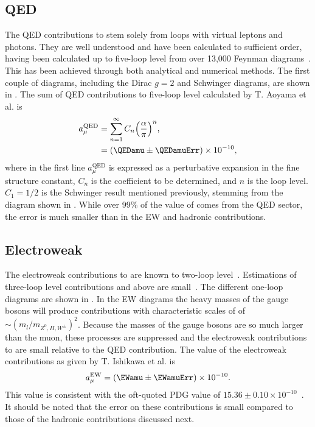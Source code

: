 \subsection{QED}
\label{subsec:QED}

The QED contributions to \amu stem solely from loops with virtual leptons and photons. They are well understood and have been calculated to sufficient order, having been calculated up to five-loop level from over 13,000 Feynman diagrams~\cite{Kinoshita1,Kinoshita2}. This has been achieved through both analytical and numerical methods. The first couple of diagrams, including the Dirac $g = 2$ and Schwinger diagrams, are shown in . The sum of QED contributions to five-loop level calculated by T. Aoyama et al. is~\cite{Kinoshita1,Kinoshita2}
		\begin{equation}
		\begin{aligned}
            a_{\mu}^{\text{QED}} &= \sum_{n=1}^{\infty} C_{n} \Big( \frac{\alpha}{\pi} \Big)^{n}, \\
            					 &= (\QEDamu \pm \QEDamuErr) \times 10^{-10},
		\end{aligned}
		\end{equation}
where in the first line $a_{\mu}^{\text{QED}}$ is expressed as a perturbative expansion in the fine structure constant, $C_{n}$ is the coefficient to be determined, and $n$ is the loop level. $C_{1} = 1/2$ is the Schwinger result mentioned previously, stemming from the diagram shown in . While over 99\% of the value of \amu comes from the QED sector, the error is much smaller than in the EW and hadronic contributions.



\subsection{Electroweak}
\label{subsec:Electroweak}

The electroweak contributions to \amu are known to two-loop level~\cite{Ishikawa:2018rlv}. Estimations of three-loop level contributions and above are small~\cite{EW1}. The different one-loop diagrams are shown in . In the EW diagrams the heavy masses of the gauge bosons will produce contributions with characteristic scales of of $\sim(m_{l}/m_{Z^{0},H,W^{\pm}})^{2}$. Because the masses of the gauge bosons are so much larger than the muon, these processes are suppressed and the electroweak contributions to \amu are small relative to the QED contribution. The value of the electroweak contributions as given by T. Ishikawa et al. is~\cite{Ishikawa:2018rlv}
		\begin{align}
            a_{\mu}^{\text{EW}} = (\EWamu \pm \EWamuErr) \times 10^{-10}.
		\end{align}
This value is consistent with the oft-quoted PDG value of $15.36 \pm 0.10 \times 10^{-10}$~\cite{EW1}. It should be noted that the error on these contributions is small compared to those of the hadronic contributions discussed next.

